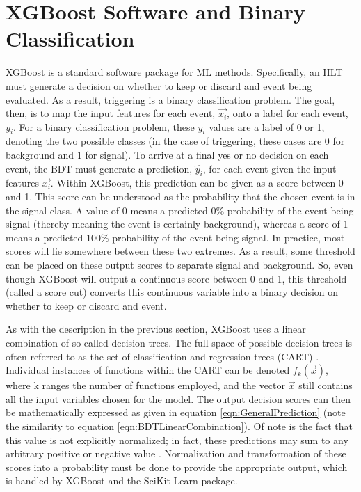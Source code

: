 \documentclass[12pt]{ucsddissertation}
\begin{document}

\section{XGBoost Software and Binary Classification} \label{sec:XGBoost}

XGBoost is a standard software package for ML methods. Specifically, an HLT must generate a decision on whether to keep or discard and event being evaluated. As a result, triggering is a binary classification problem. The goal, then, is to map the input features for each event, $\vec{x_i}$, onto a label for each event, $y_i$. For a binary classification problem, these $y_i$ values are a label of 0 or 1, denoting the two possible classes (in the case of triggering, these cases are 0 for background and 1 for signal). To arrive at a final yes or no decision on each event, the BDT must generate a prediction, $\hat{y_i}$, for each event given the input features $\vec{x_i}$. Within XGBoost, this prediction can be given as a score between 0 and 1. This score can be understood as the probability that the chosen event is in the signal class. A value of 0 means a predicted 0\% probability of the event being signal (thereby meaning the event is certainly background), whereas a score of 1 means a predicted 100\% probability of the event being signal. In practice, most scores will lie somewhere between these two extremes. As a result, some threshold can be placed on these output scores to separate signal and background. So, even though XGBoost will output a continuous score between 0 and 1, this threshold (called a score cut) converts this continuous variable into a binary decision on whether to keep or discard and event.

As with the description in the previous section, XGBoost uses a linear combination of so-called decision trees. The full space of possible decision trees is often referred to as the set of classification and regression trees (CART) \cite{BDTPaper}. Individual instances of functions within the CART can be denoted $f_k(\vec{x})$, where k ranges the number of functions employed, and the vector $\vec{x}$ still contains all the input variables chosen for the model. The output decision scores can then be mathematically expressed as given in equation \ref{eqn:GeneralPrediction} (note the similarity to equation \ref{eqn:BDTLinearCombination}). Of note is the fact that this value is not explicitly normalized; in fact, these predictions may sum to any arbitrary positive or negative value \cite{XGBoostDocumentation}. Normalization and transformation of these scores into a probability must be done to provide the appropriate output, which is handled by XGBoost and the SciKit-Learn package.
\end{document}
